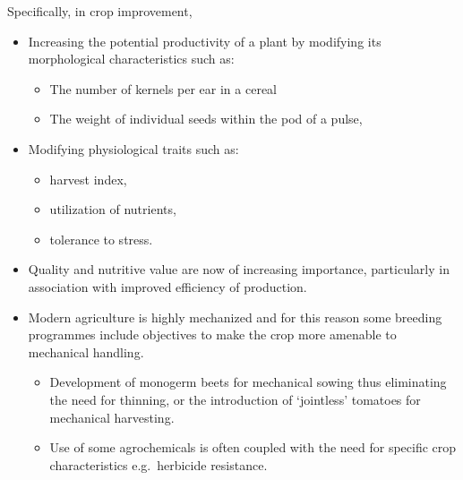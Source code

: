 \documentclass[11pt,ignorenonframetext,aspectratio=169]{beamer}
\providecommand{\tightlist}{%
  \setlength{\itemsep}{0pt}\setlength{\parskip}{0pt}}
\begin{document}
\begin{frame}{Specifically, in crop improvement,}
\protect\hypertarget{specifically-in-crop-improvement}{}
\begin{itemize}
\tightlist
\item
  Increasing the potential productivity of a plant by modifying its
  morphological characteristics such as:

  \begin{itemize}
  \tightlist
  \item
    The number of kernels per ear in a cereal
  \item
    The weight of individual seeds within the pod of a pulse,
  \end{itemize}
\item
  Modifying physiological traits such as:

  \begin{itemize}
  \tightlist
  \item
    harvest index,
  \item
    utilization of nutrients,
  \item
    tolerance to stress.
  \end{itemize}
\item
  Quality and nutritive value are now of increasing importance,
  particularly in association with improved efficiency of production.
\end{itemize}
\end{frame}

\begin{frame}{}
\protect\hypertarget{section-16}{}
\begin{itemize}
\tightlist
\item
  Modern agriculture is highly mechanized and for this reason some
  breeding programmes include objectives to make the crop more amenable
  to mechanical handling.

  \begin{itemize}
  \tightlist
  \item
    Development of monogerm beets for mechanical sowing thus eliminating
    the need for thinning, or the introduction of `jointless' tomatoes
    for mechanical harvesting.
  \item
    Use of some agrochemicals is often coupled with the need for
    specific crop characteristics e.g.~herbicide resistance.
  \end{itemize}
\end{itemize}
\end{frame}
\end{document}
